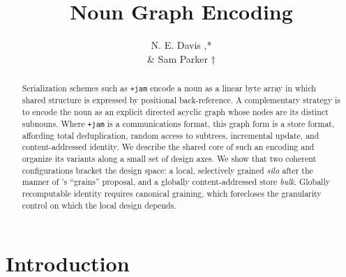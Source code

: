 \documentclass[twoside]{article}
\title{Noun Graph Encoding}
\author{N. E. Davis \patp{lagrev-nocfep},* \\ \& Sam Parker \patp{borlug-walryd}† \\ \affiliation}
\date{}
\begin{document}
\maketitle
\thispagestyle{firststyle}

\begin{abstract}
Serialization schemes such as \texttt{+jam} encode a noun as a linear byte array in which shared structure is expressed by positional back-reference.  A complementary strategy is to encode the noun as an explicit directed acyclic graph whose nodes are its distinct subnouns.  Where \texttt{+jam} is a communications format, this graph form is a store format, affording total deduplication, random access to subtrees, incremental update, and content-addressed identity.  We describe the shared core of such an encoding and organize its variants along a small set of design axes.  We show that two coherent configurations bracket the design space:  a local, selectively grained \emph{silo} after the manner of 's ``grains'' proposal, and a globally content-\linebreak addressed store \emph{bulk}.  Globally recomputable identity requires canonical graining, which forecloses the granularity control on which the local design depends.
\end{abstract}

\setcounter{page}{1}

\tableofcontents

\section{Introduction}
\end{document}
